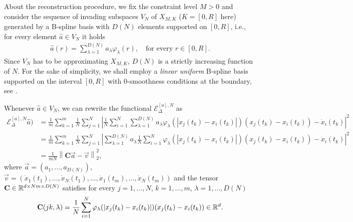 About the reconstruction procedure, we fix the constraint level $M>0$ and consider the sequence of invading subspaces $V_N$ of $X_{M,K}$ ($K=[0, R]$ here) generated by a B-spline basis with $D(N) $ elements supported on $[0,R]$, i.e., for every element $\widehat{a} \in V_N$ it holds
\begin{align*}
	\widehat{a}(r) = \sum^{D(N)}_{\lambda = 1} a_{\lambda} \varphi_{\lambda}(r), \quad \text{for every } r \in [0,R].
\end{align*}
Since $V_N$ has to be approximating $X_{M,K}$, $D(N)$ is a strictly increasing function of $N$. For the sake of simplicity, we shall employ a \textit{linear uniform} B-spline basis supported on the interval $[0,R]$ with $0$-smoothness conditions at the boundary, see \cite{deboor}.

Whenever $\widehat{a} \in V_N$, we can rewrite the functional $\mathcal{E}^{[a],N}_\Delta$ as
\begin{align*}
\mathcal{E}^{[a],N}_\Delta\widehat{a}) & = \frac{1}{m} \sum^m_{k = 1} \frac{1}{N} \sum^N_{j = 1} \left| \frac{1}{N} \sum^N_{i = 1} \sum^{D(N)}_{\lambda = 1} a_{\lambda} \varphi_{\lambda}(|x_j(t_k) - x_i(t_k)|)(x_j(t_k) - x_i(t_k)) - \dot{x}_i(t_k)\right|^2 \\
& = \frac{1}{m} \sum^m_{k = 1} \frac{1}{N} \sum^N_{j = 1} \left| \sum^{D(N)}_{\lambda = 1} a_{\lambda} \frac{1}{N} \sum^N_{i = 1} \varphi_{\lambda}(|x_j(t_k) - x_i(t_k)|)(x_j(t_k) - x_i(t_k)) - \dot{x}_i(t_k)\right|^2 \\
& = \frac{1}{mN} \left\| \mathbf C  \vec{a} - \vec v \right\|^2_{2},
\end{align*}
where $\vec{a} = (a_1, \ldots, a_{D(N)})$, $\vec v = (\dot{x}_1(t_1), \ldots, \dot{x}_N(t_1), \ldots,\dot{x}_1(t_m), \ldots, \dot{x}_N(t_m))$ and the tensor $\mathbf C \in \mathbb{R}^{d\times Nm \times D(N)}$ satisfies for every $j = 1, \ldots,N$, $k = 1, \ldots,m$, $\lambda = 1, \ldots,D(N)$
\begin{align*}
\mathbf C(jk,\lambda) = \frac{1}{N} \sum^N_{i = 1} \varphi_{\lambda}(|x_j(t_k) - x_i(t_k)|)(x_j(t_k) - x_i(t_k)) \in \mathbb{R}^d.
\end{align*}

